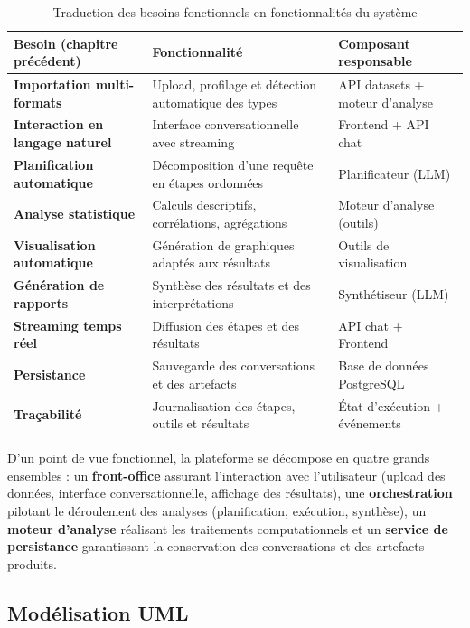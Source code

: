 \begin{table}[H]
\centering
\caption{Traduction des besoins fonctionnels en fonctionnalités du système}
\label{tab:besoins-fonctions}
\small
\begin{tabularx}{\textwidth}{>{\bfseries}p{4.2cm}Y>{\raggedright\arraybackslash}p{4.4cm}}
\toprule
{}
\color{white}Besoin (chapitre précédent) & \color{white}Fonctionnalité & \color{white}Composant responsable \\
\midrule
Importation multi-formats & Upload, profilage et détection automatique des types & API datasets + moteur d'analyse \\
\midrule
Interaction en langage naturel & Interface conversationnelle avec streaming & Frontend + API chat \\
\midrule
Planification automatique & Décomposition d'une requête en étapes ordonnées & Planificateur (LLM) \\
\midrule
Analyse statistique & Calculs descriptifs, corrélations, agrégations & Moteur d'analyse (outils) \\
\midrule
Visualisation automatique & Génération de graphiques adaptés aux résultats & Outils de visualisation \\
\midrule
Génération de rapports & Synthèse des résultats et des interprétations & Synthétiseur (LLM) \\
\midrule
Streaming temps réel & Diffusion des étapes et des résultats & API chat + Frontend \\
\midrule
Persistance & Sauvegarde des conversations et des artefacts & Base de données PostgreSQL \\
\midrule
Traçabilité & Journalisation des étapes, outils et résultats & État d'exécution + événements \\
\bottomrule
\end{tabularx}
\end{table}

D'un point de vue fonctionnel, la plateforme se décompose en quatre grands ensembles : un \textbf{front-office} assurant l'interaction avec l'utilisateur (upload des données, interface conversationnelle, affichage des résultats), une \textbf{orchestration} pilotant le déroulement des analyses (planification, exécution, synthèse), un \textbf{moteur d'analyse} réalisant les traitements computationnels et un \textbf{service de persistance} garantissant la conservation des conversations et des artefacts produits.

\subsection{Modélisation UML}

